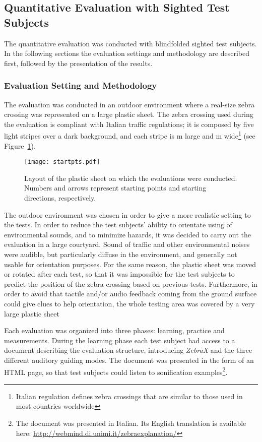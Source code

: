 \documentclass{article}
\newcommand{\zebra}{\emph{ZebraX}}
\begin{document}
\subsection{Quantitative Evaluation with Sighted Test Subjects}
\label{sub:quantitative}
The quantitative evaluation was conducted with  blindfolded sighted test subjects.
In the following sections the evaluation settings and methodology are described first, followed by the presentation of the results.

\subsubsection{Evaluation Setting and Methodology}
The evaluation was conducted in an outdoor environment where a real-size zebra crossing was represented on a large plastic sheet.
The zebra crossing used during the evaluation is compliant with Italian traffic regulations; it is composed by five light stripes over a dark background, and each stripe is m large and m wide\footnote{Italian regulation defines zebra crossings that are similar to those used in most countries worldwide} (see Figure~\ref{fig:startpts}).

\begin{figure}[t!]
	\centering
		\texttt{[image: startpts.pdf]}
	\caption[]{Layout of the plastic sheet on which the evaluations were conducted. Numbers and arrows represent starting points and starting directions, respectively.}
	\label{fig:startpts}
\end{figure}

The outdoor environment was chosen in order to give a more realistic setting to the tests.
In order to reduce the test subjects' ability to orientate using of environmental sounds, and to minimize hazards, it was decided to carry out the evaluation in a large courtyard. Sound of traffic and other environmental noises were audible, but particularly diffuse in the environment, and generally not usable for orientation purposes.
For the same reason, the plastic sheet was moved or rotated after each test, so that it was impossible for the test subjects to predict the position of the zebra crossing based on previous tests.
Furthermore, in order to avoid that tactile and/or audio feedback coming from the ground surface could give clues to help orientation, the whole testing area was covered by a very large plastic sheet

Each evaluation was organized into three phases: learning, practice and measurements.
During the learning phase each test subject had access to a document describing the evaluation structure,
introducing \zebra{} and the three different auditory guiding modes.
The document was presented in the form of an HTML page, so that test subjects could listen to sonification examples\footnote{The document was presented in Italian. Its English translation is available here: \url{http://webmind.di.unimi.it/zebraexplanation/}}.
\end{document}
